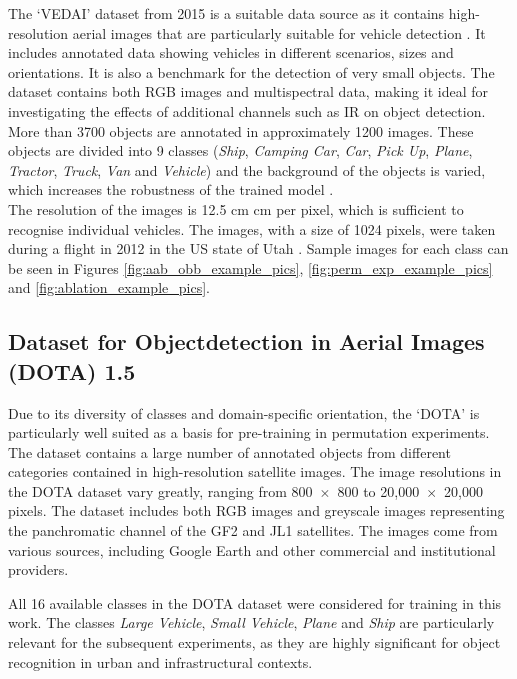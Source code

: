 The ‘\Acrfull{VEDAI}’ dataset \cite{vedai_web}  from 2015 is a suitable data source as it contains high-resolution aerial images that are particularly suitable for vehicle detection \cite{Razakarivony2015}. It includes annotated data showing vehicles in different scenarios, sizes and orientations. It is also a benchmark for the detection of very small objects. The dataset contains both \acrshort{RGB} images and multispectral data, making it ideal for investigating the effects of additional channels such as \acrshort{IR} on object detection. More than 3700 objects are annotated in approximately 1200 images. These objects are divided into 9 classes (\textit{Ship}, \textit{Camping Car}, \textit{Car}, \textit{Pick Up}, \textit{Plane}, \textit{Tractor}, \textit{Truck}, \textit{Van} and \textit{Vehicle}) and the background of the objects is varied, which increases the robustness of the trained model \cite{Razakarivony2015}. \\
The resolution of the images is 12.5 cm  cm per pixel, which is sufficient to recognise individual vehicles. The images, with a size of 1024  pixels, were taken during a flight in 2012 in the US state of Utah \cite{Razakarivony2015}. Sample images for each class can be seen in Figures \ref{fig:aab_obb_example_pics}, \ref{fig:perm_exp_example_pics} and \ref{fig:ablation_example_pics}.



\subsection{Dataset for Objectdetection in Aerial Images (DOTA) 1.5}
\label{subsec:DOTA}
Due to its diversity of classes and domain-specific orientation, the ‘\Acrfull{DOTA}’ is particularly well suited as a basis for pre-training in permutation experiments. The dataset contains a large number of annotated objects from different categories contained in high-resolution satellite images. The image resolutions in the \acrshort{DOTA} dataset vary greatly, ranging from 800~$\times$~800 to 20,000~$\times$~20,000 pixels. The dataset includes both \acrshort{RGB} images and greyscale images representing the panchromatic channel of the GF2 and JL1 satellites. The images come from various sources, including Google Earth and other commercial and institutional providers.

All 16 available classes in the DOTA dataset were considered for training in this work. The classes \textit{Large Vehicle}, \textit{Small Vehicle}, \textit{Plane} and \textit{Ship} are particularly relevant for the subsequent experiments, as they are highly significant for object recognition in urban and infrastructural contexts.

